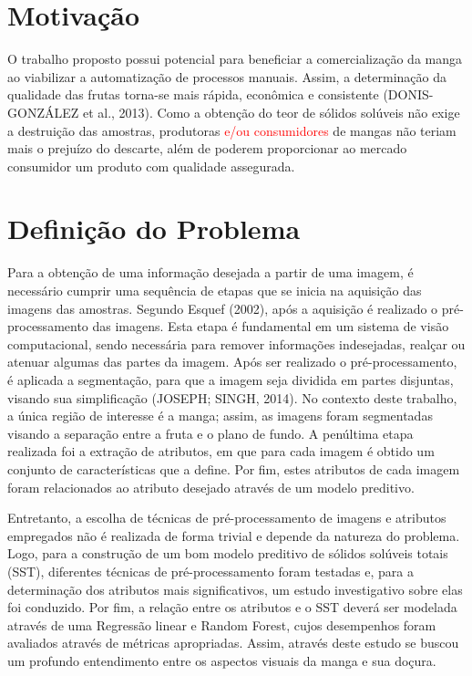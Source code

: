 \section{Motivação}

O trabalho proposto possui potencial para beneficiar a comercialização da manga ao viabilizar a automatização de processos manuais. Assim, a determinação da qualidade das frutas torna-se mais rápida, econômica e consistente (DONIS-GONZÁLEZ et al., 2013). Como a obtenção do teor de sólidos solúveis não exige a destruição das amostras, produtoras \textcolor{red}{e/ou consumidores} de mangas não teriam mais o prejuízo do descarte, além de poderem proporcionar ao mercado consumidor um produto com qualidade assegurada. 

\section{Definição do Problema}

Para a obtenção de uma informação desejada a partir de uma imagem, é necessário cumprir uma sequência de etapas que se inicia na aquisição das imagens das amostras. Segundo Esquef (2002), após a aquisição é realizado o pré-processamento das imagens. Esta etapa é fundamental em um sistema de visão computacional, sendo necessária para remover informações indesejadas, realçar ou atenuar algumas das partes da imagem. Após ser realizado o pré-processamento, é aplicada a segmentação, para que a imagem seja dividida em partes disjuntas, visando sua simplificação (JOSEPH; SINGH, 2014). No contexto deste trabalho, a única região de interesse é a manga; assim, as imagens foram segmentadas visando a separação entre a fruta e o plano de fundo. A penúltima etapa realizada foi a extração de atributos, em que para cada imagem é obtido um conjunto de características que a define. Por fim, estes atributos de cada imagem foram relacionados ao atributo desejado através de um modelo preditivo.

Entretanto, a escolha de técnicas de pré-processamento de imagens e atributos empregados não é realizada de forma trivial e depende da natureza do problema. Logo, para a construção de um bom modelo preditivo de sólidos solúveis totais (SST), diferentes técnicas de pré-processamento foram testadas e, para a determinação dos atributos mais significativos, um estudo investigativo sobre elas foi conduzido. Por fim, a relação entre os atributos e o SST deverá ser modelada através de uma Regressão linear e Random Forest, cujos desempenhos foram avaliados através de métricas apropriadas. Assim, através deste estudo se buscou um profundo entendimento entre os aspectos visuais da manga e sua doçura. 

